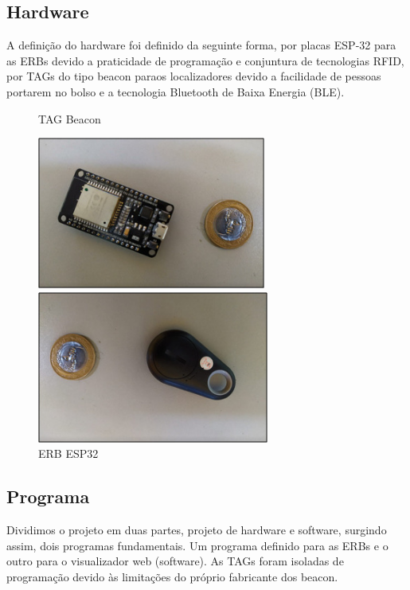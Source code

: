 \documentclass[
	article,			%
	12pt,				%
	oneside,			%
	a4paper,			%
	english,			%
	brazil,				%
	sumario=tradicional
	]{abntex2}
\begin{document}
\subsection{Hardware}
A definição do hardware foi definido da seguinte forma, por placas ESP-32 para as ERBs devido a praticidade de programação e conjuntura de tecnologias RFID, por TAGs do tipo beacon paraos localizadores devido a facilidade de pessoas portarem no bolso e a tecnologia Bluetooth de Baixa Energia (BLE).
	\begin{figure}[H]
		\begin{center}
			\caption{TAG Beacon}
			\includegraphics[height=5cm]{image2} \quad 
			\caption{ERB ESP32}
			\includegraphics[height=5cm]{image3} 
		\end{center}
	\end{figure}	
\subsection{Programa}
Dividimos o projeto em duas partes, projeto de hardware e software, surgindo assim, dois programas fundamentais. Um programa definido para as ERBs e o outro para o visualizador web (software). As TAGs foram isoladas de programação devido às limitações do próprio fabricante dos beacon.
\end{document}
